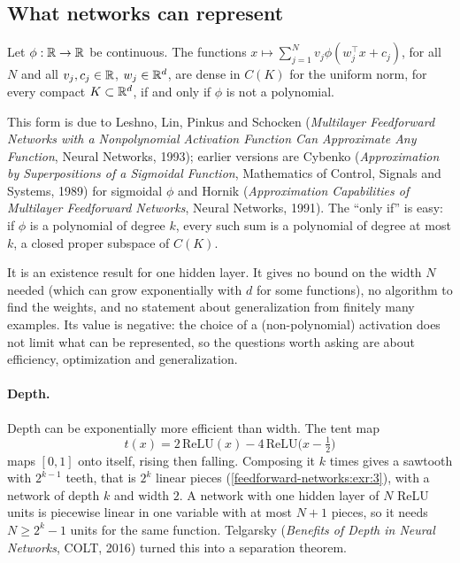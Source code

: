 \begin{notechapter}
\section{What networks can represent}\label{feedforward-networks:sec:uat}

\begin{theorem}\label{feedforward-networks:thm:uat}
Let $\phi:\mathbb{R}\to\mathbb{R}$ be continuous. The functions $x\mapsto\sum_{j=1}^Nv_j\phi(w_j^\top x + c_j)$, for all $N$ and
all $v_j, c_j\in\mathbb{R}$, $w_j\in\mathbb{R}^d$, are dense in $C(K)$ for the uniform norm, for every compact $K\subset\mathbb{R}^d$, if and
only if $\phi$ is not a polynomial.
\end{theorem}

This form is due to Leshno, Lin, Pinkus and Schocken (\emph{Multilayer Feedforward Networks
with a Nonpolynomial Activation Function Can Approximate Any Function}, Neural Networks,
1993); earlier versions are Cybenko (\emph{Approximation by Superpositions of a Sigmoidal
Function}, Mathematics of Control, Signals and Systems, 1989) for sigmoidal $\phi$ and Hornik
(\emph{Approximation Capabilities of Multilayer Feedforward Networks}, Neural Networks,
1991). The ``only if'' is easy: if $\phi$ is a polynomial of degree $k$, every such sum is a
polynomial of degree at most $k$, a closed proper subspace of $C(K)$.

\begin{pitfall}
It is an existence result for one hidden layer. It gives no bound on the width $N$ needed
(which can grow exponentially with $d$ for some functions), no algorithm to find the
weights, and no statement about generalization from finitely many examples. Its value is
negative: the choice of a (non-polynomial) activation does not limit what can be
represented, so the questions worth asking are about efficiency, optimization and
generalization.
\end{pitfall}

\paragraph{Depth.} Depth can be exponentially more efficient than width. The tent map
\[
  t(x) = 2\,\mathrm{ReLU}(x) - 4\,\mathrm{ReLU}\bigl(x - \tfrac12\bigr)
\]
maps $[0,1]$ onto itself, rising then falling. Composing
it $k$ times gives a sawtooth with $2^{k-1}$ teeth, that is $2^k$ linear pieces
(\cref{feedforward-networks:exr:3}), with a network of depth $k$ and width $2$. A network
with one hidden layer of $N$ ReLU units is piecewise linear in one variable with at most
$N + 1$ pieces, so it needs $N\geq2^k - 1$ units for the same function. Telgarsky
(\emph{Benefits of Depth in Neural Networks}, COLT, 2016) turned this into a
separation theorem.


\end{notechapter}
